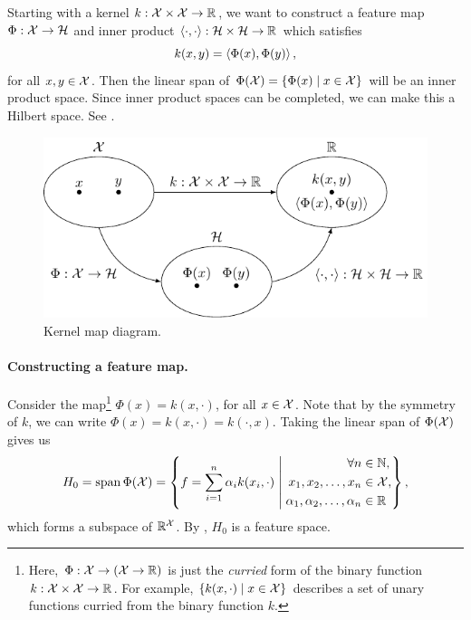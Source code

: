 Starting with a kernel \(k : \mathcal{X} \times \mathcal{X} \to \mathbb{R}\), we want to construct a feature map \(\Phi : \mathcal{X} \to \mathcal{H}\) and inner product \(\left\langle \cdot, \cdot \right\rangle : \mathcal{H} \times \mathcal{H} \to \mathbb{R}\) which satisfies
\begin{equation}
    \label{eqn:kernel-inner-product-1}
    k(x,y) = \left\langle \Phi(x), \Phi(y) \right\rangle,
\end{equation}
for all \(x, y \in \mathcal{X}\).
Then the linear span of \(\Phi(\mathcal{X}) = \{\Phi(x) \mid x \in \mathcal{X}\}\) will be an inner product space.
Since inner product spaces can be completed, we can make this a Hilbert space.
See .

\begin{figure}
    \centering
    \includegraphics[]{figs/fig-kernel-map-diagram}
    \caption{Kernel map diagram.}
    \label{fig:kernel-map-diagram}
\end{figure}

\paragraph{Constructing a feature map.}
\def\Ho{H_0}
\def\iptHo#1{\ipt{#1}_{\Ho}}

Consider the map\footnote{
    Here, \(\Phi : \mathcal{X} \to (\mathcal{X} \to \mathbb{R})\) is just the \textit{curried} form of the binary function \(k : \mathcal{X} \times \mathcal{X} \to \mathbb{R}\).
    For example, \(\{k(x, \cdot) \mid x \in \mathcal{X}\}\) describes a set of unary functions curried from the binary function \(k\).
} \(\Phi(x) = k(x, \cdot)\), for all \(x \in \mathcal{X}\).
Note that by the symmetry of \(k\), we can write \(\Phi(x) = k(x, \cdot) = k(\cdot, x)\).
Taking the linear span of \(\Phi(\mathcal{X})\) gives us
\begin{equation}
    \Ho = \lspan \Phi(\X)
    = \left\{
        f = \sum_{i=1}^{n} \alpha_i k(x_i, \cdot)
        \;\middle|\;
        \begin{aligned}
            \forall n &\in \NN,\\
            x_1, x_2, \dots, x_n &\in \X,\\
            \alpha_1, \alpha_2, \dots, \alpha_n &\in \RR
        \end{aligned}
    \right\},
\end{equation}
which forms a subspace of \(\mathbb{R}^{\mathcal{X}}\).
By , \(\Ho\) is a feature space.

